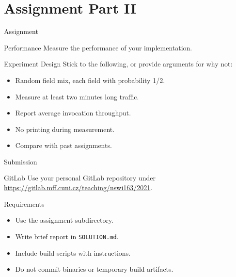 \section{Assignment Part II}


\begin{frame}{Assignment}
    \begin{block}{Performance}
        Measure the performance of your implementation.
    \end{block}

    \bigskip

    \begin{block}{Experiment Design}
        Stick to the following, or provide arguments for why not:
        \begin{itemize}
            \item Random field mix, each field with probability 1/2.
            \item Measure at least two minutes long traffic.
            \item Report average invocation throughput.
            \item No printing during measurement.
            \item Compare with past assignments.
        \end{itemize}
    \end{block}
\end{frame}


\begin{frame}{Submission}
    \begin{block}{GitLab}
        Use your personal GitLab repository under \\
        \url{https://gitlab.mff.cuni.cz/teaching/nswi163/2021}.
    \end{block}
    \begin{block}{Requirements}
        \begin{itemize}
            \item Use the assignment subdirectory.
            \item Write brief report in \lstinline{SOLUTION.md}.
            \item Include build scripts with instructions.
            \item Do not commit binaries or temporary build artifacts.
        \end{itemize}
    \end{block}
\end{frame}



